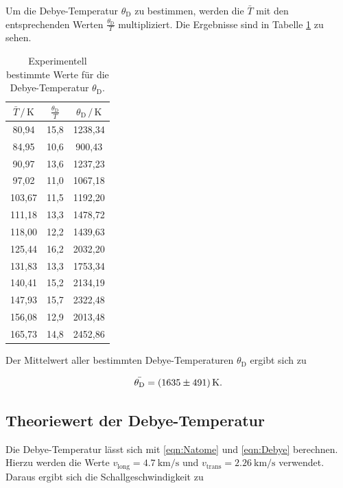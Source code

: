 Um die Debye-Temperatur $\theta_\text{D}$ zu bestimmen, werden die $\bar{T}$ mit den entsprechenden Werten $\frac{\theta_\text{D}}{T}$ \cite{Anleitung} multipliziert. 
Die Ergebnisse sind in Tabelle \ref{tab:mess3} zu sehen.\\

\begin{table}
    \centering
    \caption{Experimentell bestimmte Werte für die Debye-Temperatur $\theta_\text{D}$.}
    \label{tab:mess3}
    \begin{tabular}{c c c}
    \toprule
    $\bar{T} \,/\, \si{\kelvin}$ & $\frac{\theta_\text{D}}{T}$ & $\theta_\text{D} \,/\, \si{\kelvin}$\\
    \midrule 
         80,94 & 15,8 & 1238,34\\
         84,95 & 10,6 &  900,43\\
         90,97 & 13,6 & 1237,23\\
         97,02 & 11,0 & 1067,18\\
        103,67 & 11,5 & 1192,20\\
        111,18 & 13,3 & 1478,72\\
        118,00 & 12,2 & 1439,63\\
        125,44 & 16,2 & 2032,20\\
        131,83 & 13,3 & 1753,34\\
        140,41 & 15,2 & 2134,19\\
        147,93 & 15,7 & 2322,48\\
        156,08 & 12,9 & 2013,48\\
        165,73 & 14,8 & 2452,86\\
    \bottomrule
    \end{tabular}
\end{table}

Der Mittelwert aller bestimmten Debye-Temperaturen $\theta_\text{D}$ ergibt sich zu 

\begin{equation*}
    \bar{\theta_\text{D}} = \SI{1635+-491}{\kelvin}.
\end{equation*}

\subsection{Theoriewert der Debye-Temperatur}

Die Debye-Temperatur lässt sich mit \eqref{eqn:Natome} und \eqref{eqn:Debye} berechnen. Hierzu werden die Werte $v_\text{long} = \SI{4.7}{\kilo\meter\per\second}$ und
$v_\text{trans} = \SI{2.26}{\kilo\meter\per\second}$ \cite{Anleitung} verwendet. Daraus ergibt sich die Schallgeschwindigkeit zu 

